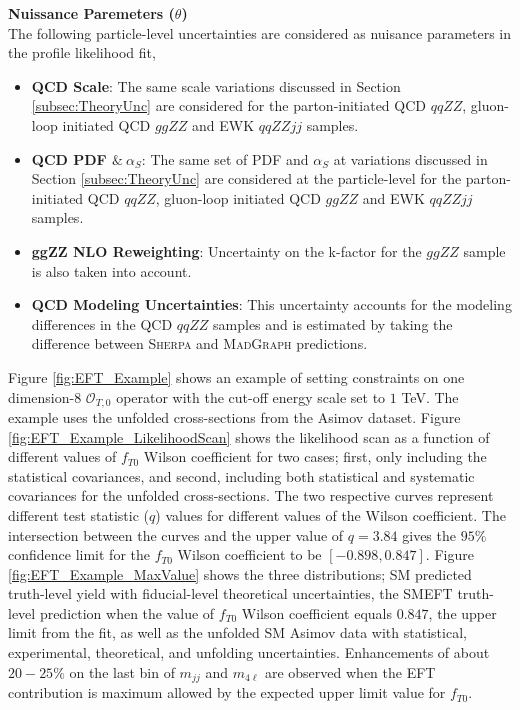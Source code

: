 \textbf{Nuissance Paremeters ($\theta$)} \\
The following particle-level uncertainties are considered as nuisance parameters in the profile likelihood fit,
\begin{itemize}
    \item{\textbf{QCD Scale}: The same scale variations discussed in Section \ref{subsec:TheoryUnc} are considered for the parton-initiated QCD $qqZZ$, gluon-loop initiated QCD $ggZZ$ and EWK $qqZZjj$ samples.} 
    \item{\textbf{QCD PDF $\& ~ \alpha_{S}$}: The same set of PDF and $\alpha_{S}$ at variations discussed in Section \ref{subsec:TheoryUnc} are considered at the particle-level for the parton-initiated QCD $qqZZ$, gluon-loop initiated QCD $ggZZ$ and EWK $qqZZjj$ samples. }
    \item{\textbf{ggZZ NLO Reweighting}: Uncertainty on the k-factor for the $ggZZ$ sample is also taken into account. }
    \item{\textbf{QCD Modeling Uncertainties}: This uncertainty accounts for the modeling differences in the QCD $qqZZ$ samples and is estimated by taking the difference between \textsc{Sherpa} and \textsc{MadGraph} predictions.} 
\end{itemize}

Figure \ref{fig:EFT_Example} shows an example of setting constraints on one dimension-8 $\mathcal{O}_{T,0}$ operator with the cut-off energy scale set to $1$ TeV. The example uses the unfolded cross-sections from the Asimov dataset. Figure \ref{fig:EFT_Example_LikelihoodScan} shows the likelihood scan as a function of different values of $f_{T0}$ Wilson coefficient for two cases; first, only including the statistical covariances, and second, including both statistical and systematic covariances for the unfolded cross-sections. The two respective curves represent different test statistic ($q$) values for different values of the Wilson coefficient. The intersection between the curves and the upper value of $q=3.84$ gives the $95\%$ confidence limit for the $f_{T0}$ Wilson coefficient to be $[-0.898,0.847]$. Figure \ref{fig:EFT_Example_MaxValue} shows the three distributions; SM predicted truth-level yield with fiducial-level theoretical uncertainties, the SMEFT truth-level prediction when the value of $f_{T0}$ Wilson coefficient equals $0.847$, the upper limit from the fit, as well as the unfolded SM Asimov data with statistical, experimental, theoretical, and unfolding uncertainties. Enhancements of about $20-25\%$ on the last bin of $m_{jj}$ and $m_{4\ell}$ are observed when the EFT contribution is maximum allowed by the expected upper limit value for $f_{T0}$. 

